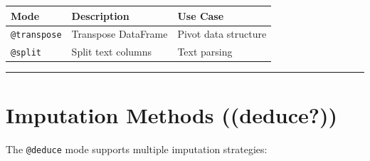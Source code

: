 \documentclass[
  letterpaper,
]{scrbook}
\begin{document}
\begin{longtable}[]{@{}lll@{}}
\toprule\noalign{}
Mode & Description & Use Case \\
\midrule\noalign{}
\endhead
\bottomrule\noalign{}
\endlastfoot
\texttt{@transpose} & Transpose DataFrame & Pivot data structure \\
\texttt{@split} & Split text columns & Text parsing \\
\end{longtable}

\begin{center}\rule{0.5\linewidth}{0.5pt}\end{center}

\section{\texorpdfstring{Imputation Methods
((\textbf{deduce?}))}{Imputation Methods ((deduce?))}}\label{imputation-methods-deduce}

The \texttt{@deduce} mode supports multiple imputation strategies:
\end{document}
